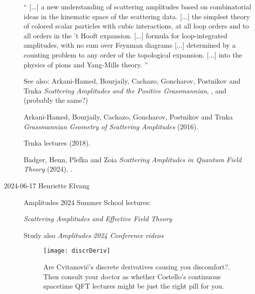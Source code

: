 \begin{description}
``
[...] a new understanding of scattering amplitudes based on
combinatorial ideas in the kinematic space of the scattering data.
[...] the simplest theory of colored scalar
particles with cubic interactions, at all loop orders and to all orders
in the 't Hooft expansion. [...] formula for
loop-integrated amplitudes, with no sum over
Feynman diagrams [...] determined by a counting
problem to any order of the topological expansion.
[...]  into the physics of pions and Yang-Mills theory.
''

See also:
Arkani-Hamed, Bourjaily, Cachazo, Goncharov, Postnikov and
Trnka %
  {\em Scattering Amplitudes and the Positive Grassmannian},
  ,
and (probably the same?)

Arkani-Hamed, Bourjaily, Cachazo, Goncharov, Postnikov and
Trnka
  {\em Grassmannian Geometry of Scattering Amplitudes} (2016).

Trnka 
{lectures} (2018).

Badger, Henn, Plefka and Zoia
{\em Scattering Amplitudes in Quantum Field Theory} (2024),
.

\item[2024-06-17 Henriette Elvang]
{Amplitudes 2024 Summer School} lectures:                                                                          

{\em Scattering Amplitudes and Effective Field Theory}    

Study also 
{\em Amplitudes 2024 Conference}  
{\em videos}  




%
\begin{figure}
\begin{center}
\texttt{[image: discrDeriv]}
\end{center}
\caption{\label{f:discrDeriv}
Are Cvitanovi{\'c}'s discrete derivatives causing you discomfort?.
Then consult your doctor as whether
Costello's continuous spacetime QFT lectures might be just the right
pill for you.
}
 \end{figure}


\end{description}
